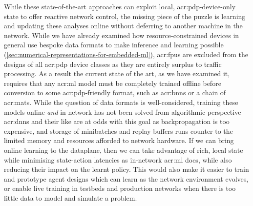 While these state-of-the-art approaches can exploit local, \gls{acr:pdp}-device-only state to offer reactive network control, the missing piece of the puzzle is learning and updating these analyses online without deferring to another machine in the network.
While we have already examined how resource-constrained devices in general use bespoke data formats to make inference and learning possible (\cref{sec:numerical-representations-for-embedded-ml}), \glspl{acr:fpu} are excluded from the designs of all \gls{acr:pdp} device classes as they are entirely surplus to traffic processing.
As a result the current state of the art, as we have examined it, requires that any \gls{acr:ml} model must be completely trained offline before conversion to some \gls{acr:pdp}-friendly format, such as \glspl{acr:bnn} or a chain of \glspl{acr:mat}.
While the question of data formats is well-considered, training these models online \emph{and} in-network has not been solved from algorithmic perspective---\glspl{acr:dnn} and their like are at odds with this goal as backpropagation is too expensive, and storage of minibatches and replay buffers runs counter to the limited memory and resources afforded to network hardware.
If we can bring online learning to the dataplane, then we can take advantage of rich, local state while minimising state-action latencies as in-network \gls{acr:ml} does, while also reducing their impact on the learnt policy.
This would also make it easier to train and prototype agent designs which can learn as the network environment evolves, or enable live training in testbeds and production networks when there is too little data to model and simulate a problem.

